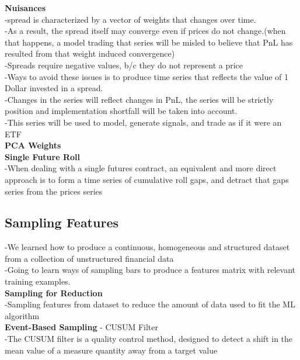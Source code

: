 \documentclass{article}
\begin{document}
\textbf{Nuisances}\\ 
-spread is characterized by a vector of weights that changes over time. \\ 
-As a result, the spread itself may converge even if prices do not change.(when that happens, a model trading that series will be misled to believe that PnL has resulted from that weight induced convergence)\\ 
-Spreads require negative values, b/c they do not represent a price\\ 

-Ways to avoid these issues is to produce time series that reflects the value of 1 Dollar invested in a spread.\\ 
-Changes in the series will reflect changes in PnL, the series will be strictly position and implementation shortfall will be taken into account.\\ 
-This series will be used to model, generate signals, and trade as if it were an ETF\\ 

\textbullet \textbf{PCA Weights}\\ 

\textbullet \textbf{Single Future Roll}\\ 
-When dealing with a single futures contract, an equivalent and more direct approach is to form a time series of cumulative roll gaps, and detract that gaps series from the prices series\\ 

\subsection{Sampling Features\\ }
-We learned how to produce a continuous, homogeneous and structured dataset from a collection of unstructured financial data\\ 
-Going to learn ways of sampling bars to produce a features matrix with relevant training examples.\\ 

\textbullet \textbf{Sampling for Reduction}\\ 
-Sampling features from dataset to reduce the amount of data used to fit the ML algorithm\\ 

\textbullet \textbf{Event-Based Sampling} - CUSUM Filter \\ 
-The CUSUM filter is a quality control method, designed to detect a shift in the mean value of a measure quantity away from a target value\\ 
\end{document}
